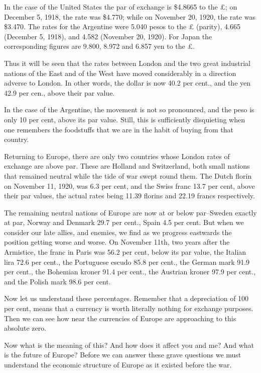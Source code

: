 \documentclass{book}
\begin{document}
In the case of the United States the par of exchange is \$4.8665 to the £; on December 5, 1918, the rate was \$4.770; while on November 20, 1920, the rate was \$3.470. The rates for the Argentine were 5.040 pesos to the £ (parity), 4.665 (December 5, 1918), and 4.582 (November 20, 1920). For Japan the corresponding figures are 9.800, 8.972 and 6.857 yen to the £.

Thus it will be seen that the rates between London and the two great industrial nations of the East and of the West have moved considerably in a direction adverse to London. In other words, the dollar is now 40.2 per cent., and the yen 42.9 per cen., above their par value.

In the case of the Argentine, the movement is not so pronounced, and the peso is only 10 per cent, above its par value. Still, this is sufficiently disquieting when one remembers the foodstuffs that we are in the habit of buying from that country.

Returning to Europe, there are only two countries whose London rates of exchange are above par. These are Holland and Switzerland, both small nations that remained neutral while the tide of war swept round them. The Dutch florin on November 11, 1920, was 6.3 per cent, and the Swiss franc 13.7 per cent, above their par values, the actual rates being 11.39 florins and 22.19 francs respectively.

The remaining neutral nations of Europe are now at or below par–Sweden exactly at par, Norway and Denmark 29.7 per cent., Spain 4.5 per cent. But when we consider our late allies, and enemies, we find as we progress eastwards the position getting worse and worse. On November 11th, two years after the Armistice, the franc in Paris was 56.2 per cent, below its par value, the Italian lira 72.6 per cent., the Portuguese escudo 85.8 per cent., the German mark 91.9 per cent., the Bohemian kroner 91.4 per cent., the Austrian kroner 97.9 per cent., and the Polish mark 98.6 per cent.

Now let us understand these percentages. Remember that a depreciation of 100 per cent, means that a currency is worth literally nothing for exchange purposes. Then we can see how near the currencies of Europe are approaching to this absolute zero.

Now what is the meaning of this? And how does it affect you and me? And what is the future of Europe? Before we can answer these grave questions we must understand the economic structure of Europe as it existed before the war.
\end{document}

